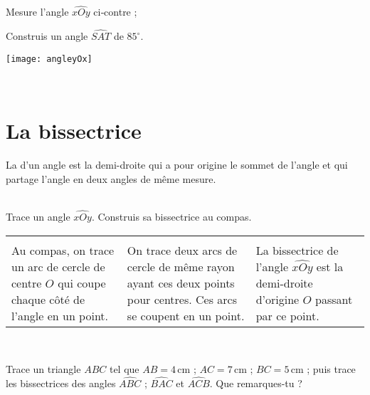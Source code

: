 \begin{methode*1}
\exercice
 \begin{enumerate}
 \begin{minipage}[c]{0.36\textwidth}
  \item Mesure l'angle $\widehat{xOy}$ ci‑contre ;
  \item Construis un angle $\widehat{SAT}$ de $85^\circ$. 
  \end{minipage} \hfill%
 \begin{minipage}[c]{0.56\textwidth}
  \texttt{[image: angleyOx]} 
  \end{minipage} \\
  \end{enumerate}
 
\end{methode*1}



\section{La bissectrice}

\begin{definition}
La \textbf{} d'un angle est la demi-droite qui a pour origine le sommet de l'angle et qui partage l'angle en deux angles de même mesure.
\end{definition}


\begin{methode*1}


\begin{exemple*1} \\[0.75em]
Trace un angle $\widehat{xOy}$. Construis sa bissectrice au compas. \\[0.5em]

\begin{tabularx}{\textwidth}{X|X|X}
  &   &  \\ 
Au compas, on trace un arc de cercle de centre $O$ qui coupe chaque côté de l'angle en un point. & On trace deux arcs de cercle de même rayon ayant ces deux points pour centres. Ces arcs se coupent en un point. & La bissectrice de l'angle $\widehat{xOy}$ est la demi-droite d'origine $O$ passant par ce point. \\
\end{tabularx} \\

 \end{exemple*1}

\exercice 

Trace un triangle $ABC$ tel que $AB=4$\,cm ; $AC=7$\,cm ; $BC=5$\,cm ; puis trace les bissectrices des angles $\widehat{ABC}$ ; $\widehat{BAC}$ et $\widehat{ACB}$. Que remarques-tu ?


 
\end{methode*1}

